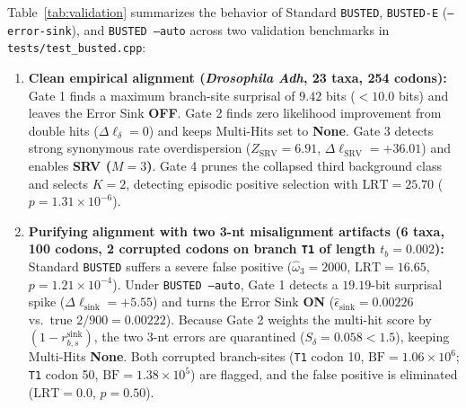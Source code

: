\documentclass[11pt]{article}
\begin{document}
Table~\ref{tab:validation} summarizes the behavior of Standard \texttt{BUSTED}, \texttt{BUSTED-E} (\texttt{--error-sink}), and \texttt{BUSTED --auto} across two validation benchmarks in \texttt{tests/test\_busted.cpp}:
\begin{enumerate}[nosep]
    \item \textbf{Clean empirical alignment (\textit{Drosophila Adh}, 23 taxa, 254 codons):} Gate 1 finds a maximum branch-site surprisal of $9.42$ bits ($< 10.0$ bits) and leaves the Error Sink \textbf{OFF}. Gate 2 finds zero likelihood improvement from double hits ($\Delta \ell_\delta = 0$) and keeps Multi-Hits set to \textbf{None}. Gate 3 detects strong synonymous rate overdispersion ($Z_{\text{SRV}} = 6.91$, $\Delta \ell_{\text{SRV}} = +36.01$) and enables \textbf{SRV ($M=3$)}. Gate 4 prunes the collapsed third background class and selects \textbf{$K=2$}, detecting episodic positive selection with $\text{LRT} = 25.70$ ($p = 1.31 \times 10^{-6}$).
    \item \textbf{Purifying alignment with two 3-nt misalignment artifacts (6 taxa, 100 codons, 2 corrupted codons on branch \texttt{T1} of length $t_b = 0.002$):} Standard \texttt{BUSTED} suffers a severe false positive ($\hat{\omega}_3 = 2000$, $\text{LRT} = 16.65$, $p = 1.21 \times 10^{-4}$). Under \texttt{BUSTED --auto}, Gate 1 detects a $19.19$-bit surprisal spike ($\Delta \ell_{\text{sink}} = +5.55$) and turns the Error Sink \textbf{ON} ($\hat{\epsilon}_{\text{sink}} = 0.00226$ vs.\ true $2/900 = 0.00222$). Because Gate 2 weights the multi-hit score by $(1 - r_{b,s}^{\text{sink}})$, the two 3-nt errors are quarantined ($S_\delta = 0.058 < 1.5$), keeping Multi-Hits \textbf{None}. Both corrupted branch-sites (\texttt{T1} codon 10, $\text{BF} = 1.06 \times 10^6$; \texttt{T1} codon 50, $\text{BF} = 1.38 \times 10^5$) are flagged, and the false positive is eliminated ($\text{LRT} = 0.0$, $p = 0.50$).
\end{enumerate}
\end{document}
